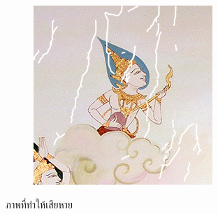 \begin{figure}[H]
\begin{subfigure}{0.4\linewidth}
		\includegraphics[width=0.8\linewidth]{image/thaiart/case05-toinpaint.png}			
	\end{subfigure}
	\caption{ภาพที่ทำให้เสียหาย}
\end{figure}